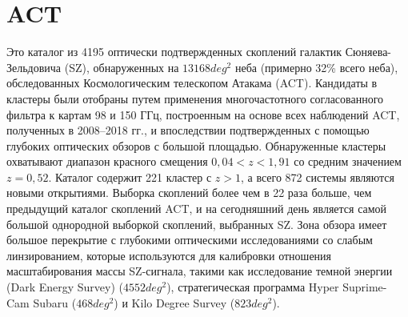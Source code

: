 \section{ACT}
\cite{Act}
Это каталог из 4195 оптически подтвержденных скоплений галактик Сюняева-Зельдовича (SZ), 
обнаруженных на $13 168 deg^{2}$ неба (примерно 32\% всего неба), обследованных Космологическим 
телескопом Атакама (ACT). Кандидаты в кластеры были отобраны путем применения многочастотного
согласованного фильтра к картам 98 и 150 ГГц, построенным на основе всех наблюдений ACT, 
полученных в 2008–2018 гг., и впоследствии подтвержденных с помощью глубоких оптических обзоров с 
большой площадью. Обнаруженные кластеры охватывают диапазон красного смещения $0,04 < z <1,91$ со 
средним значением $z = 0,52$. Каталог содержит 221 кластер с $z > 1$, а всего 872 системы являются 
новыми открытиями. Выборка скоплений более чем в 22 раза больше, чем предыдущий каталог скоплений 
ACT, и на сегодняшний день является самой большой однородной выборкой скоплений, выбранных SZ. 
Зона обзора имеет большое перекрытие с глубокими оптическими исследованиями со слабым 
линзированием, которые используются для калибровки отношения масштабирования массы SZ-сигнала, 
такими как исследование темной энергии (Dark Energy Survey) ($4 552 deg^{2}$), стратегическая 
программа Hyper Suprime-Cam Subaru ($468 deg^{2}$) и Kilo Degree Survey ($823 deg^{2}$).\\


